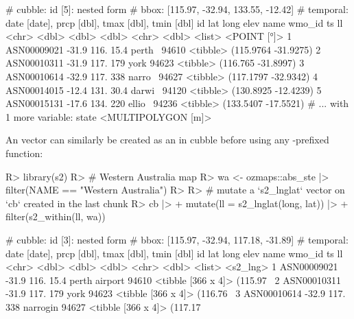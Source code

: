 \documentclass[
]{jss}
\begin{document}
\begin{CodeChunk}
\begin{CodeOutput}
# cubble:   id [5]: nested form
# bbox:     [115.97, -32.94, 133.55, -12.42]
# temporal: date [date], prcp [dbl], tmax [dbl], tmin [dbl]
  id            lat  long  elev name   wmo_id ts                        ll
  <chr>       <dbl> <dbl> <dbl> <chr>   <dbl> <list>           <POINT [°]>
1 ASN00009021 -31.9  116.  15.4 perth~  94610 <tibble> (115.9764 -31.9275)
2 ASN00010311 -31.9  117. 179   york    94623 <tibble>  (116.765 -31.8997)
3 ASN00010614 -32.9  117. 338   narro~  94627 <tibble> (117.1797 -32.9342)
4 ASN00014015 -12.4  131.  30.4 darwi~  94120 <tibble> (130.8925 -12.4239)
5 ASN00015131 -17.6  134. 220   ellio~  94236 <tibble> (133.5407 -17.5521)
# ... with 1 more variable: state <MULTIPOLYGON [m]>
\end{CodeOutput}
\end{CodeChunk}

An   vector can similarly be created as an
 in cubble before using any -prefixed function:

\begin{CodeChunk}
\begin{CodeInput}
R> library(s2)
R> # Western Australia map
R> wa <- ozmaps::abs_ste |> filter(NAME == "Western Australia")
R> 
R> # mutate a `s2_lnglat` vector on `cb` created in the last chunk
R> cb |>
+   mutate(ll = s2_lnglat(long, lat)) |>
+   filter(s2_within(ll, wa))
\end{CodeInput}
\begin{CodeOutput}
# cubble:   id [3]: nested form
# bbox:     [115.97, -32.94, 117.18, -31.89]
# temporal: date [date], prcp [dbl], tmax [dbl], tmin [dbl]
  id            lat  long  elev name          wmo_id ts                 ll      
  <chr>       <dbl> <dbl> <dbl> <chr>          <dbl> <list>             <s2_lng>
1 ASN00009021 -31.9  116.  15.4 perth airport  94610 <tibble [366 x 4]> (115.97~
2 ASN00010311 -31.9  117. 179   york           94623 <tibble [366 x 4]> (116.76~
3 ASN00010614 -32.9  117. 338   narrogin       94627 <tibble [366 x 4]> (117.17~
\end{CodeOutput}
\end{CodeChunk}
\end{document}
